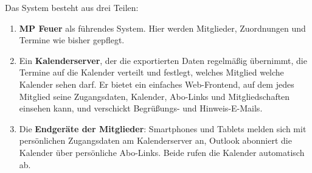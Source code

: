 \documentclass[a4paper,fontsize=10pt]{scrartcl}
\begin{document}
Das System besteht aus drei Teilen:

\begin{enumerate}
  \item \textbf{MP Feuer} als führendes System. Hier werden Mitglieder,
        Zuordnungen und Termine wie bisher gepflegt.
  \item Ein \textbf{Kalenderserver}, der die exportierten Daten regelmäßig
        übernimmt, die Termine auf die Kalender verteilt und festlegt, welches
        Mitglied welche Kalender sehen darf. Er bietet ein einfaches
        Web-Frontend, auf dem jedes Mitglied seine Zugangsdaten, Kalender,
        Abo-Links und Mitgliedschaften einsehen kann, und verschickt
        Begrüßungs- und Hinweis-E-Mails.
  \item Die \textbf{Endgeräte der Mitglieder}: Smartphones und Tablets melden
        sich mit persönlichen Zugangsdaten am Kalenderserver an, Outlook
        abonniert die Kalender über persönliche Abo-Links. Beide rufen die
        Kalender automatisch ab.
\end{enumerate}
\end{document}

